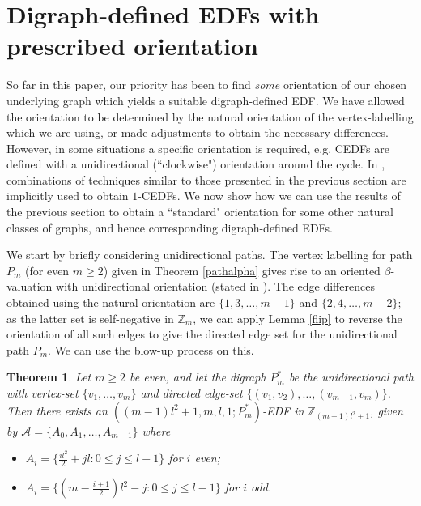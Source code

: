 \documentclass[12pt, a4paper]{article}
\newtheorem{theorem}{Theorem}[section]
\theoremstyle{definition}
\begin{document}
\section{Digraph-defined EDFs with prescribed orientation}

So far in this paper, our priority has been to find \emph{some} orientation of our chosen underlying graph which yields a suitable digraph-defined EDF. We have allowed the orientation to be determined by the natural orientation of the vertex-labelling which we are using, or made adjustments to obtain the necessary differences.  However, in some situations a specific orientation is required, e.g. CEDFs are defined with a unidirectional (``clockwise") orientation around the cycle.  In \cite{PatStiCEDF}, combinations of techniques similar to those presented in the previous section are implicitly used to obtain $1$-CEDFs.  
We now show how we can use the results of the previous section to obtain a ``standard" orientation for some other natural classes of graphs, and hence corresponding digraph-defined EDFs.

We start by briefly considering unidirectional paths.  The vertex labelling for path $P_m$ (for even $m \geq 2$) given in Theorem \ref{pathalpha} gives rise to an oriented $\beta$-valuation with unidirectional orientation (stated in \cite{BloHsu}). The edge differences obtained using the natural orientation are $\{1,3,\ldots,m-1\}$ and $\{2,4,\ldots,m-2\}$; as the latter set is self-negative in $\mathbb{Z}_m$, we can apply Lemma \ref{flip} to reverse the orientation of all such edges to give the directed edge set for the unidirectional path $P_m$. We can use the blow-up process on this.


\begin{theorem}
Let $m \geq 2$ be even, and let the digraph $P_m^*$ be the unidirectional path with vertex-set $\{v_1,\ldots,v_m\}$ and directed edge-set $\{(v_1,v_2),\ldots,(v_{m-1},v_m)\}$.  Then there exists an $((m-1)l^2+1,m,l,1;P^*_m)$-EDF in $\mathbb{Z}_{(m-1)l^2+1}$, given by $\mathcal{A}=\{A_0,A_1,\ldots, A_{m-1}\}$
where
\begin{itemize}
\item $A_i = \{\frac{il^2}{2}+jl: 0 \leq j \leq l-1\}$ for $i$ even;
\item $A_i=\{(m-\frac{i+1}{2})l^2-j: 0 \leq j \leq l-1\}$ for $i$ odd.
\end{itemize}
\end{theorem}
\end{document}
